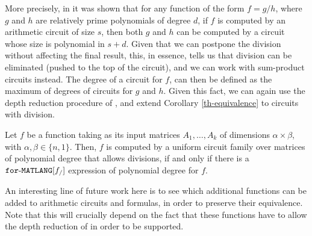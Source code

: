 More precisely, in \cite{strassen1973vermeidung,borodin1982fast,kaltofen1988greatest} it was shown that for any function of the form $f = g/h$, where $g$ and $h$ are relatively prime polynomials of degree $d$, if $f$ is computed by an arithmetic circuit of size $s$, then both $g$ and $h$ can be computed by a circuit whose size is polynomial in $s + d$. Given that we can postpone the division without affecting the final result, this, in essence, tells us that division can be eliminated (pushed to the top of the circuit), and we can work with sum-product circuits instead. The degree of a circuit for $f$, can then be defined as the maximum of degrees of circuits for $g$ and $h$. Given this fact, we can again use the depth reduction procedure of \cite{AllenderJMV98}, and extend Corollary 
\ref{th-equivalence} to circuits with division.
\begin{corollary}
\label{cor-division}
Let $f$ be a function taking as its input matrices $A_1,\ldots ,A_k$ of dimensions $\alpha\times \beta$, with $\alpha,\beta \in \{n,1\}$. Then, $f$ is computed by a uniform circuit family over matrices of polynomial degree that allows divisions, if and only if there is a $\texttt{for}\text{-}\texttt{MATLANG}[f_/]$ expression of polynomial degree for $f$.
\end{corollary}


An interesting line of future work here is to see which additional functions can be added to arithmetic circuits and \langfor formulas, in order to preserve their equivalence. Note that this will crucially depend on the fact that these functions have to allow the depth reduction of \cite{AllenderJMV98} in order to be supported.


